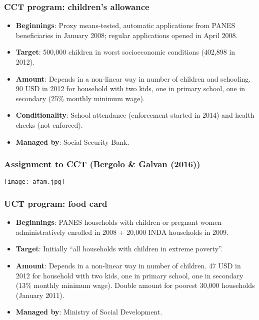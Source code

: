 \documentclass{beamer}
\begin{document}
\begin{frame}
		\frametitle{CCT program: children's allowance}
		\begin{itemize}
			\item \textbf{Beginnings}: Proxy means-tested, automatic applications from PANES beneficiaries in January 2008; regular applications opened in April 2008.
			\item \textbf{Target}: 500,000 children in worst socioeconomic conditions (402,898 in 2012).
			\item \textbf{Amount}: Depends in a non-linear way in number of children and schooling. 90 USD in 2012 for household with two kids, one in primary school, one in secondary (25\% monthly minimum wage).
			\item \textbf{Conditionality}: School attendance (enforcement started in 2014) and health checks (not enforced).
			\item \textbf{Managed by}: Social Security Bank.	
		\end{itemize}
\end{frame}

\begin{frame}
\frametitle{Assignment to CCT (Bergolo \& Galvan (2016))}
\begin{center}
	\texttt{[image: afam.jpg]}
	\label{afam}
\end{center}
\end{frame}

\begin{frame}
\frametitle{UCT program: food card}
\begin{itemize}
	\item \textbf{Beginnings}: PANES households with children or pregnant women administratively enrolled in 2008 + 20,000 INDA households in 2009.
	\item \textbf{Target}: Initially ``all households with children in extreme poverty''.
	\item \textbf{Amount}: Depends in a non-linear way in number of children. 47 USD in 2012 for household with two kids, one in primary school, one in secondary (13\% monthly minimum wage). Double amount for poorest 30,000 households (January 2011).
	\item \textbf{Managed by}: Ministry of Social Development.		
\end{itemize}
\end{frame}
	
\end{document}

